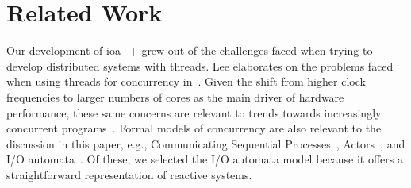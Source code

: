 \section{Related Work\label{related_work}}

Our development of ioa++ grew out of the challenges faced when trying to develop distributed systems with threads.
Lee elaborates on the problems faced when using threads for concurrency in~\cite{lee2006problem}.
Given the shift from higher clock frequencies to larger numbers of cores as the main driver of hardware performance, these same concerns are relevant to trends towards increasingly concurrent programs~\cite{sutter2005software}.
Formal models of concurrency are also relevant to the discussion in this paper, e.g., Communicating Sequential Processes~\cite{hoare1978communicating}, Actors~\cite{agha1986actors}, and I/O automata~\cite{lynch1996distributed}.
Of these, we selected the I/O automata model because it offers a straightforward representation of reactive systems.




